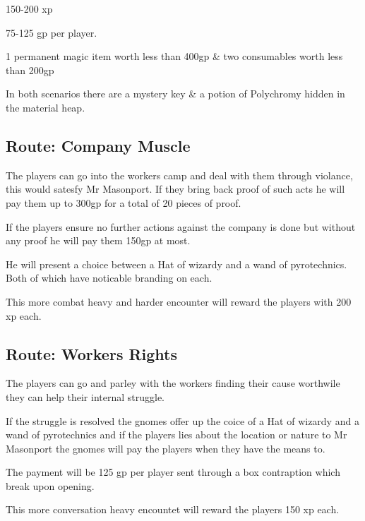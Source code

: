 \documentclass{article}
\begin{document}
    150-200 xp

    75-125 gp per player.

    1 permanent magic item worth less than 400gp \& two consumables worth less than 200gp

    In both scenarios there are a mystery key \& a potion of Polychromy hidden in the material heap.
    \subsection{Route: Company Muscle}

    The players can go into the workers camp and deal with them through violance, this would satesfy Mr Masonport. If they bring back proof of such acts he will pay them up to 300gp for a total of 20 pieces of proof.

    If the players ensure no further actions against the company is done but without any proof he will pay them 150gp at most.
    
    He will present a choice between a Hat of wizardy and a wand of pyrotechnics. Both of which have noticable branding on each.

    This more combat heavy and harder encounter will reward the players with 200 xp each.

    \subsection{Route: Workers Rights}

    The players can go and parley with the workers finding their cause worthwile they can help their internal struggle. 

    If the struggle is resolved the gnomes offer up the coice of a Hat of wizardy and a wand of pyrotechnics and if the players lies about the location or nature to Mr Masonport the gnomes will pay the players when they have the means to.

    The payment will be 125 gp per player sent through a box contraption which break upon opening.

    This more conversation heavy encountet will reward the players 150 xp each.

    
\end{document}
